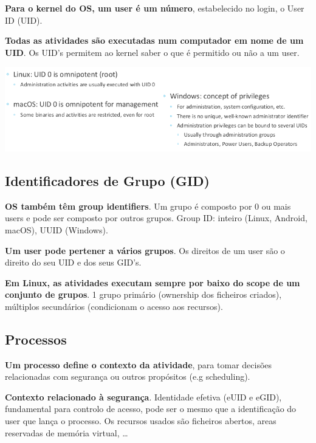 \documentclass{article}
\begin{document}
\begin{flushleft}
  \textbf{Para o kernel do OS, um user é um número}, estabelecido no login, o User ID (UID).

  \vspace{2mm}

  \textbf{Todas as atividades são executadas num computador em nome de um UID}. Os UID's
  permitem ao kernel saber o que é permitido ou não a um user.
\end{flushleft}

\begin{center}
  \includegraphics[scale=0.4]{29}
\end{center}

\subsection{Identificadores de Grupo (GID)}

\begin{flushleft}
  \textbf{OS também têm group identifiers}. Um grupo é composto por 0 ou mais
  users e pode ser composto por outros grupos. Group ID: inteiro (Linux,
  Android, macOS), UUID (Windows).

  \vspace{2mm}

  \textbf{Um user pode pertener a vários grupos}. Os direitos de um user são
  o direito do seu UID e dos seus GID's.

  \vspace{2mm}

  \textbf{Em Linux, as atividades executam sempre por baixo do scope de um
  conjunto de grupos}. 1 grupo primário (ownership dos ficheiros criados),
  múltiplos secundários (condicionam o acesso aos recursos).
\end{flushleft}

\subsection{Processos}

\begin{flushleft}
  \textbf{Um processo define o contexto da atividade}, para tomar decisões
  relacionadas com segurança ou outros propósitos (e.g scheduling).

  \vspace{2mm}

  \textbf{Contexto relacionado à segurança}. Identidade efetiva (eUID e eGID),
  fundamental para controlo de acesso, pode ser o mesmo que a identificação
  do user que lança o processo. Os recursos usados são ficheiros abertos,
  areas reservadas de memória virtual, \dots
\end{flushleft}
\end{document}
